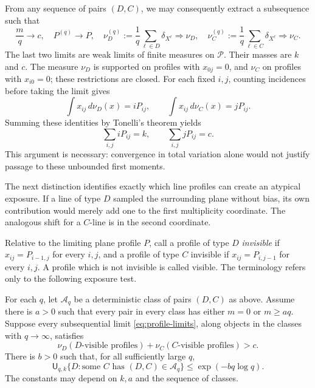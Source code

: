 From any sequence of pairs $(D,C)$, we may consequently extract a
subsequence such that
\begin{equation}\label{eq:profile-limits}
 \frac mq\longrightarrow c,\quad P^{(q)}\longrightarrow P,\quad
 \nu_D^{(q)}:=\frac1q\sum_{\ell\in D}\delta_{X^\ell}
       \Longrightarrow\nu_D,\quad
 \nu_C^{(q)}:=\frac1q\sum_{\ell\in C}\delta_{X^\ell}
       \Longrightarrow\nu_C.
\end{equation}
The last two limits are weak limits of finite measures on $\mathscr P$.
Their masses are $k$ and $c$.  The measure $\nu_D$ is supported on profiles
with $x_{0j}=0$, and $\nu_C$ on profiles with $x_{i0}=0$; these restrictions
are closed.  For each fixed $i,j$, counting incidences before taking the
limit gives
\begin{equation}\label{eq:profile-incidences}
 \int x_{ij}\,d\nu_D(x)=iP_{ij},\qquad
 \int x_{ij}\,d\nu_C(x)=jP_{ij}.
\end{equation}
Summing these identities by Tonelli's theorem yields
\begin{equation}\label{eq:profile-means}
 \sum_{i,j}iP_{ij}=k,\qquad \sum_{i,j}jP_{ij}=c.
\end{equation}
This argument is necessary: convergence in total variation alone would
not justify passage to these unbounded first moments.

The next distinction identifies exactly which line profiles can create
an atypical exposure. If a line of type $D$ sampled the surrounding plane
without bias, its own contribution would merely add one to the first
multiplicity coordinate. The analogous shift for a $C$-line is in the
second coordinate.

Relative to the limiting plane profile $P$, call a profile of type $D$
\emph{invisible} if $x_{ij}=P_{i-1,j}$ for every $i,j$, and a profile of
type $C$ invisible if $x_{ij}=P_{i,j-1}$ for every $i,j$.  A profile which
is not invisible is called visible.  The terminology refers only to the
following exposure test.

\begin{lemma}\label{lem:profile-counting}
For each $q$, let $\mathscr A_q$ be a deterministic class of pairs $(D,C)$
as above.  Assume there is $a>0$ such that every pair in every class has
either $m=0$ or $m\ge aq$.  Suppose every subsequential limit
\eqref{eq:profile-limits}, along objects in the classes with $q\to\infty$,
satisfies
\begin{equation}\label{eq:visible-excess}
 \nu_D(\text{$D$-visible profiles})+
 \nu_C(\text{$C$-visible profiles})>c.
\end{equation}
There is $b>0$ such that, for all sufficiently large $q$,
\[
 \mathsf U_{q,k}\{D:\text{some }C\text{ has }(D,C)\in\mathscr A_q\}
 \le \exp(-bq\log q).
\]
The constants may depend on $k,a$ and the sequence of classes.
\end{lemma}

